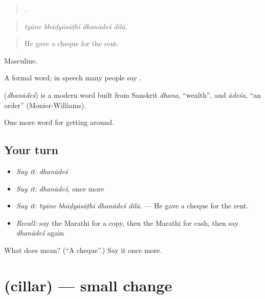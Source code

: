 \begin{quote}
   .
\end{quote}

\begin{quote}
\emph{tyāne bhāḍyāsāṭhī dhanādeś dilā.}
\end{quote}

\begin{quote}
He gave a cheque for the rent.
\end{quote}

Masculine.

A formal word; in speech many people say .

\begin{cousinweb}
\textbf{} (\emph{dhanādeś}) is a modern word built from Sanskrit \emph{dhana}, \textquotedblleft{}wealth\textquotedblright{}, and \emph{ādeśa}, \textquotedblleft{}an order\textquotedblright{} (Monier-Williams).
\end{cousinweb}

\begin{grammarlens}[title={What you've built}]
One more word for getting around.
\end{grammarlens}

\subsection*{Your turn}
\begin{itemize}
\raggedright
  \item \emph{Say it:} \emph{dhanādeś}
  \item \emph{Say it:} \emph{dhanādeś}, once more
  \item \emph{Say it:} \emph{tyāne bhāḍyāsāṭhī dhanādeś dilā.} — He gave a cheque for the rent.
  \item \emph{Recall:} say the Marathi for a copy, then the Marathi for cash, then say \emph{dhanādeś} again
\end{itemize}

\begin{tcolorbox}[breakable,colback=teal!4,colframe=teal!35!black,title={Before you move on}]
What does  mean? (\textquotedblleft{}A cheque\textquotedblright{}.) Say it once more.
\end{tcolorbox}
\section[\texorpdfstring{\mr{चिल्लर} (cillar)}{चिल्लर (cillar)}]{ (cillar) — small change}

